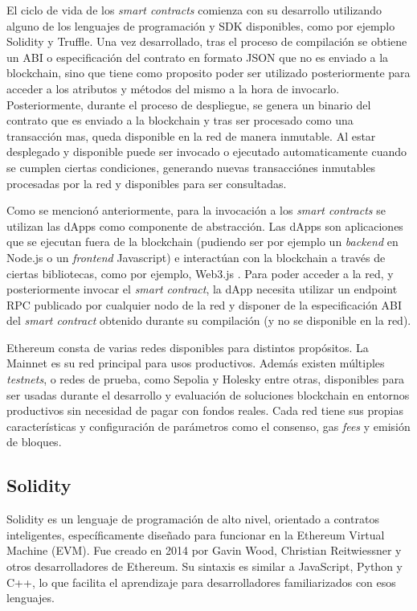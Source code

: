 El ciclo de vida de los \textit{smart contracts} comienza con su desarrollo utilizando alguno de los lenguajes de programación y SDK disponibles, como por ejemplo Solidity y Truffle. Una vez desarrollado, tras el proceso de compilación se obtiene un ABI \citep{abi} o especificación del contrato en formato JSON que no es enviado a la blockchain, sino que tiene como proposito poder ser utilizado posteriormente para acceder a los atributos y métodos del mismo a la hora de invocarlo. Posteriormente, durante el proceso de despliegue, se genera un binario del contrato que es enviado a la blockchain y tras ser procesado como una transacción mas, queda disponible en la red de manera inmutable. Al estar desplegado y disponible puede ser invocado o ejecutado automaticamente cuando se cumplen ciertas condiciones, generando nuevas transacciónes inmutables procesadas por la red y disponibles para ser consultadas.

Como se mencionó anteriormente, para la invocación a los \textit{smart contracts} se utilizan las dApps como componente de abstracción. Las dApps son aplicaciones que se ejecutan fuera de la blockchain (pudiendo ser por ejemplo un \textit{backend} en Node.js o un \textit{frontend} Javascript) e interactúan con la blockchain a través de ciertas bibliotecas, como por ejemplo, Web3.js \citep{web3}. Para poder acceder a la red, y posteriormente invocar el \textit{smart contract}, la dApp necesita utilizar un endpoint RPC publicado por cualquier nodo de la red y disponer de la especificación ABI del \textit{smart contract} obtenido durante su compilación (y no se disponible en la red).

Ethereum consta de varias redes disponibles para distintos propósitos. La Mainnet \citep{mainnet} es su red principal para usos productivos. Además existen múltiples \textit{testnets}, o redes de prueba, como Sepolia \citep{sepolia} y Holesky \citep{holesky} entre otras, disponibles para ser usadas durante el desarrollo y evaluación de soluciones blockchain en entornos productivos sin necesidad de pagar con fondos reales. Cada red tiene sus propias características y configuración de parámetros como el consenso, gas \textit{fees} y emisión de bloques.


\subsection{Solidity}

Solidity \cite{solidity} es un lenguaje de programación de alto nivel, orientado a contratos inteligentes, específicamente diseñado para funcionar en la Ethereum Virtual Machine (EVM). Fue creado en 2014 por Gavin Wood, Christian Reitwiessner y otros desarrolladores de Ethereum. Su sintaxis es similar a JavaScript, Python y C++, lo que facilita el aprendizaje para desarrolladores familiarizados con esos lenguajes. 


